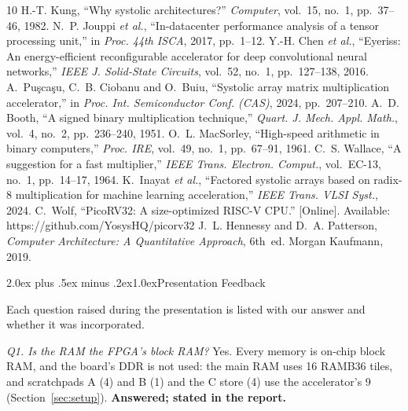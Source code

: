 \documentclass[10pt,twocolumn,a4paper]{article}
\makeatletter
\renewcommand\thesection{\Roman{section}}
\renewcommand\section{\@startsection{section}{1}{\z@}%
  {2.0ex plus .5ex minus .2ex}{1.0ex}{\centering\normalfont\scshape}}
\makeatother
\begin{document}
\begin{thebibliography}{10}\footnotesize\setlength\itemsep{0pt}
 H.-T. Kung, ``Why systolic architectures?'' \emph{Computer},
vol.~15, no.~1, pp.~37--46, 1982.
 N.~P. Jouppi \emph{et al.}, ``In-datacenter performance
analysis of a tensor processing unit,'' in \emph{Proc. 44th ISCA}, 2017,
pp.~1--12.
 Y.-H. Chen \emph{et al.}, ``Eyeriss: An energy-efficient
reconfigurable accelerator for deep convolutional neural networks,''
\emph{IEEE J. Solid-State Circuits}, vol.~52, no.~1, pp.~127--138, 2016.
 A.~Pu\c{s}ca\c{s}u, C.~B. Ciobanu and O.~Buiu, ``Systolic
array matrix multiplication accelerator,'' in \emph{Proc. Int. Semiconductor
Conf. (CAS)}, 2024, pp.~207--210.
 A.~D. Booth, ``A signed binary multiplication technique,''
\emph{Quart. J. Mech. Appl. Math.}, vol.~4, no.~2, pp.~236--240, 1951.
 O.~L. MacSorley, ``High-speed arithmetic in binary
computers,'' \emph{Proc. IRE}, vol.~49, no.~1, pp.~67--91, 1961.
 C.~S. Wallace, ``A suggestion for a fast multiplier,''
\emph{IEEE Trans. Electron. Comput.}, vol.~EC-13, no.~1, pp.~14--17, 1964.
 K.~Inayat \emph{et al.}, ``Factored systolic arrays based on
radix-8 multiplication for machine learning acceleration,'' \emph{IEEE Trans.
VLSI Syst.}, 2024.
 C.~Wolf, ``PicoRV32: A size-optimized RISC-V CPU.''
[Online]. Available: https://github.com/YosysHQ/picorv32
 J.~L. Hennessy and D.~A. Patterson, \emph{Computer Architecture:
A Quantitative Approach}, 6th~ed. Morgan Kaufmann, 2019.
\end{thebibliography}

\appendix
\renewcommand\thesection{\Alph{section}}
\section{Presentation Feedback}

Each question raised during the presentation is listed with our answer and
whether it was incorporated.

\emph{Q1. Is the RAM the FPGA's block RAM?} Yes. Every memory is on-chip
block RAM, and the board's DDR is not used: the main RAM uses 16 RAMB36 tiles,
and scratchpads A (4) and B (1) and the C store (4) use the accelerator's 9
(Section~\ref{sec:setup}). \textbf{Answered; stated in the report.}
\end{document}
